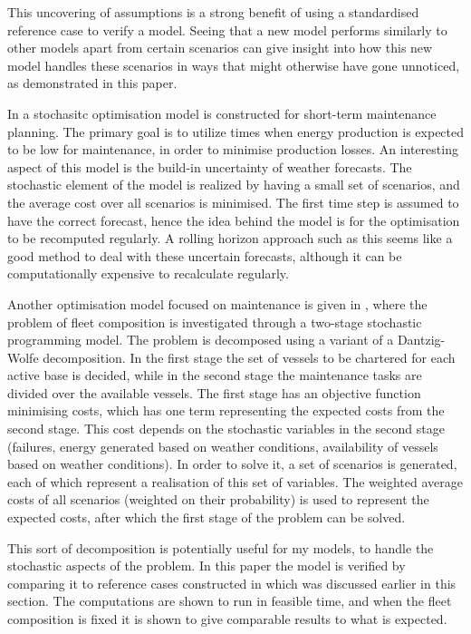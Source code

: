 \documentclass[a4paper,12pt]{article}
\begin{document}
This uncovering of assumptions is a strong benefit of using a standardised reference case to verify a model. Seeing that a new model performs similarly to other models apart from certain scenarios can give insight into how this new model handles these scenarios in ways that might otherwise have gone unnoticed, as demonstrated in this paper.

\bigskip

In \cite{besnard2011stochastic} a stochasitc optimisation model is constructed for short-term maintenance planning. The primary goal is to utilize times when energy production is expected to be low for maintenance, in order to minimise production losses. An interesting aspect of this model is the build-in uncertainty of weather forecasts. The stochastic element of the model is realized by having a small set of scenarios, and the average cost over all scenarios is minimised. The first time step is assumed to have the correct forecast, hence the idea behind the model is for the optimisation to be recomputed regularly. A rolling horizon approach such as this seems like a good method to deal with these uncertain forecasts, although it can be computationally expensive to recalculate regularly. 

\bigskip

Another optimisation model focused on maintenance is given in \cite{staalhane2019optimizing}, where the problem of fleet composition is investigated through a two-stage stochastic programming model. The problem is decomposed using a variant of a Dantzig-Wolfe decomposition. In the first stage the set of vessels to be chartered for each active base is decided, while in the second stage the maintenance tasks are divided over the available vessels. The first stage has an objective function minimising costs, which has one term representing the expected costs from the second stage. This cost depends on the stochastic variables in the second stage (failures, energy generated based on weather conditions, availability of vessels based on weather conditions). In order to solve it, a set of scenarios is generated, each of which represent a realisation of this set of variables. The weighted average costs of all scenarios (weighted on their probability) is used to represent the expected costs, after which the first stage of the problem can be solved. 

This sort of decomposition is potentially useful for my models, to handle the stochastic aspects of the problem. In this paper the model is verified by comparing it to reference cases constructed in \cite{dinwoodie2015reference} which was discussed earlier in this section. The computations are shown to run in feasible time, and when the fleet composition is fixed it is shown to give comparable results to what is expected.
\end{document}
